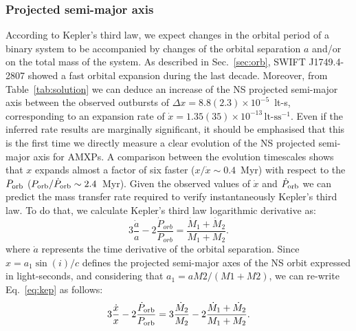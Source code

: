 \documentclass[fleqn,usenatbib]{mnras}
\newcommand{\swiftj}{SWIFT J1749.4-2807}
\begin{document}
\subsubsection{Projected semi-major axis}
According to Kepler's third law, we expect changes in the orbital period of a binary system to be accompanied by changes of the orbital separation $a$ and/or on the total mass of the system. As described in Sec.~\ref{sec:orb}, \swiftj{} showed a fast orbital expansion during the last decade. Moreover, from Table~\ref{tab:solution} we can deduce an increase of the NS projected semi-major axis between the observed outbursts of $\Delta x=8.8(2.3)\times 10^{-5}$~lt-s, corresponding to an expansion rate of $\dot{x}=1.35(35)\times 10^{-13}\,\text{lt-s}\text{s}^{-1}$. Even if the inferred rate results are marginally significant, it should be emphasised that this is the first time we directly measure a clear evolution of the NS projected semi-major axis for AMXPs. A comparison between the evolution timescales shows that $x$ expands almost a factor of six faster ($x/\dot{x}\sim 0.4$~Myr) with respect to the $P_{\rm orb}$ ($P_{\rm orb}/\dot{P}_{\rm orb}\sim 2.4$~Myr). 
Given the observed values of $\dot{x}$ and $\dot{P}_{\rm orb}$ we can predict the mass transfer rate required to verify instantaneously Kepler's third law. To do that, we calculate Kepler's third law logarithmic derivative as:
\begin{equation}
\label{eq:kep}
3\frac{\dot{a}}{a}-2\frac{\dot{P}_{orb}}{P_{orb}}=\frac{\dot{M}_1+\dot{M}_2}{M_1+M_2}.
\end{equation}  
where $\dot{a}$ represents the time derivative of the orbital separation. Since $x=a_1 \sin(i)/c$ defines the projected semi-major axes of the NS orbit expressed in light-seconds, and considering that $a_1=aM2/(M1+M2)$, we can re-write Eq.~\ref{eq:kep} as follows:
\begin{equation}
\label{eq:kep2}
3\frac{\dot{x}}{x}-2\frac{\dot{P}_{\rm orb}}{P_{\rm orb}}=3\frac{\dot{M}_2}{M_2}-2\frac{\dot{M}_1+\dot{M}_2}{M_1+M_2}.
\end{equation}
\end{document}
